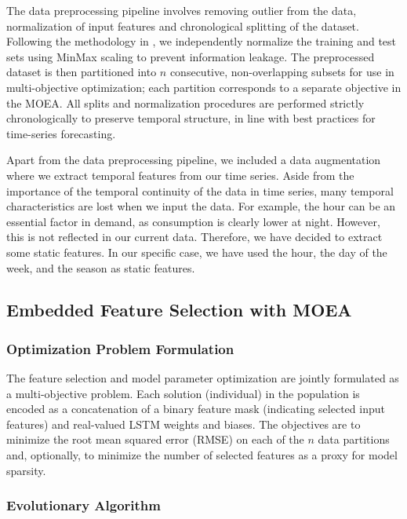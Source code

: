 \documentclass[12pt]{article}
\begin{document}
The data preprocessing pipeline involves removing outlier from the data, normalization of input features and chronological splitting of the dataset. Following the methodology in \cite{espinosa2023embeddedfeatureselectionlstm}, we independently normalize the training and test sets using MinMax scaling to prevent information leakage. The preprocessed dataset is then partitioned into $n$ consecutive, non-overlapping subsets for use in multi-objective optimization; each partition corresponds to a separate objective in the MOEA. All splits and normalization procedures are performed strictly chronologically to preserve temporal structure, in line with best practices for time-series forecasting.

Apart from the data preprocessing pipeline, we included a data augmentation where we extract temporal features from our time series. Aside from the importance of the temporal continuity of the data in time series, many temporal characteristics are lost when we input the data. For example, the hour can be an essential factor in demand, as consumption is clearly lower at night. However, this is not reflected in our current data. Therefore, we have decided to extract some static features. In our specific case, we have used the hour, the day of the week, and the season as static features.

\subsection{Embedded Feature Selection with MOEA}

\subsubsection{Optimization Problem Formulation}

The feature selection and model parameter optimization are jointly formulated as a multi-objective problem. Each solution (individual) in the population is encoded as a concatenation of a binary feature mask (indicating selected input features) and real-valued LSTM weights and biases. The objectives are to minimize the root mean squared error (RMSE) on each of the $n$ data partitions and, optionally, to minimize the number of selected features as a proxy for model sparsity.

\subsubsection{Evolutionary Algorithm}
\end{document}
